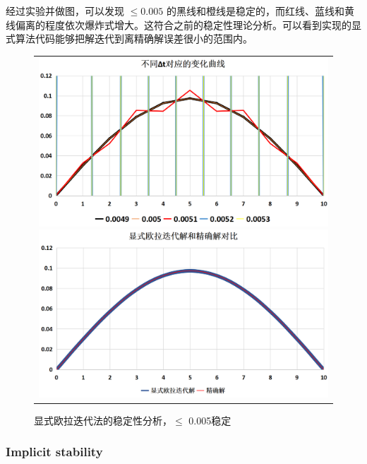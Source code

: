 \documentclass[3p]{elsarticle}
\numberwithin{equation}{section}
\begin{document}
    经过实验并做图，可以发现 $ \le   0.005 $ 的黑线和橙线是稳定的，而红线、蓝线和黄线偏离的程度依次爆炸式增大。这符合之前的稳定性理论分析。可以看到实现的显式算法代码能够把解迭代到离精确解误差很小的范围内。
    
    \begin{figure}[h]
    	\begin{center}
    		\begin{tabular}{c}
    			\includegraphics[angle=0, scale=0.15]{./figures/Explicit_Stablity.png}
    			\includegraphics[angle=0, scale=0.15]{./figures/Explicit_Stablity_Compare.png}
    		\end{tabular}
    	\end{center}
    	\caption{显式欧拉迭代法的稳定性分析，$\le$ 0.005稳定}
    	\label{fig:illustration-Explicit_Stablity}
    \end{figure}
    
    \clearpage
    \subsubsection{Implicit stability}
    
\end{document}
